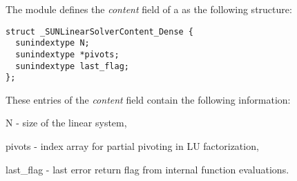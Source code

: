 The {\sunlinsollapdense} module defines the \textit{content} field of a
 as the following structure:
\begin{verbatim}
struct _SUNLinearSolverContent_Dense {
  sunindextype N;
  sunindextype *pivots;
  sunindextype last_flag;
};
\end{verbatim}
These entries of the \emph{content} field contain the following
information:
\begin{args}
  \item[N] - size of the linear system,
  \item[pivots] - index array for partial pivoting in LU factorization,
  \item[last\_flag] - last error return flag from internal function evaluations.
\end{args}
